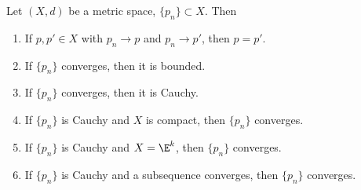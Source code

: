 \documentclass{notes}
\begin{document}
\begin{theorem}
  Let $(X,d)$ be a metric space, $\{p_n\} \subset X$. Then
  \begin{enumerate}
    \item If $p, p' \in X$ with $p_n \to p$ and $p_n \to p'$, then $p = p'$.
    \item If $\{p_n\}$ converges, then it is bounded.
    \item If $\{p_n\}$ converges, then it is Cauchy.
    \item If $\{p_n\}$ is Cauchy and $X$ is compact, then $\{p_n\}$ converges.
    \item If $\{p_n\}$ is Cauchy and $X = \E^k$, then $\{p_n\}$ converges.
    \item If $\{p_n\}$ is Cauchy and a subsequence converges, then $\{p_n\}$ converges.
  \end{enumerate}
\end{theorem}
\end{document}
